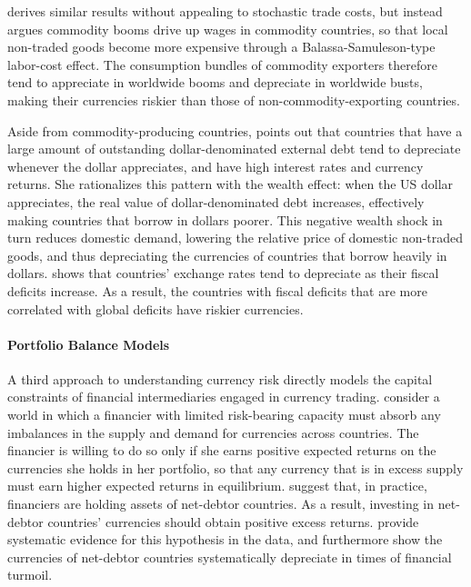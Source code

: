 \documentclass{ar-1col}
\begin{document}
\citet{Powers2015} derives similar results without appealing to stochastic trade costs, but instead argues commodity booms drive up wages in commodity countries, so that local non-traded goods become more expensive through a Balassa-Samuleson-type labor-cost effect. The consumption bundles of commodity exporters therefore tend to appreciate in worldwide booms and depreciate in worldwide busts, making their currencies riskier than those of non-commodity-exporting countries.

Aside from commodity-producing countries, \citet{Wiriadinata2020} points out that countries that have a large amount of outstanding dollar-denominated external debt tend to depreciate whenever the dollar appreciates, and have high interest rates and currency returns. She rationalizes this pattern with the wealth effect: when the US dollar appreciates, the real value of dollar-denominated debt increases, effectively making countries that borrow in dollars poorer. This negative wealth shock in turn reduces domestic demand, lowering the relative price of domestic non-traded goods, and thus depreciating the currencies of countries that borrow heavily in dollars. \citet{Jiang2020} shows that countries' exchange rates tend to depreciate as their fiscal deficits increase. As a result, the countries with fiscal deficits that are more correlated with global deficits have riskier currencies.

\paragraph*{Portfolio Balance Models} A third approach to understanding currency risk directly models the capital constraints of financial intermediaries engaged in currency trading. \citet{GabaixMaggiori2015} consider a world in which a financier with limited risk-bearing capacity must absorb any imbalances in the supply and demand for currencies across countries. The financier is willing to do so only if she earns positive expected returns on the currencies she holds in her portfolio, so that any currency that is in excess supply must earn higher expected returns in equilibrium.  \citet{GabaixMaggiori2015} suggest that, in practice, financiers are holding assets of net-debtor countries. As a result, investing in net-debtor countries' currencies should obtain positive excess returns. \citet{DellaCorteetal2016} provide systematic evidence for this hypothesis in the data, and furthermore show the currencies of net-debtor countries systematically depreciate in times of financial turmoil.
\end{document}
